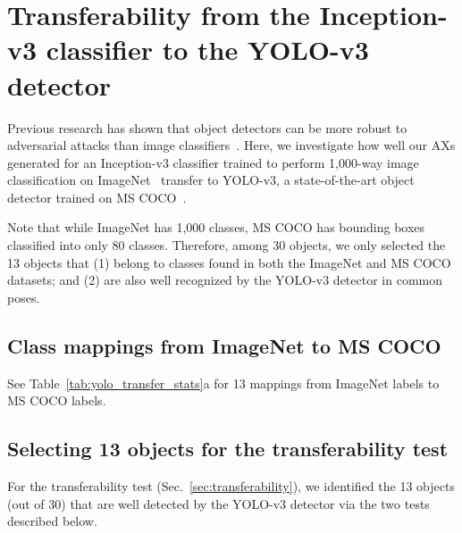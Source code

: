 \documentclass[10pt,twocolumn,letterpaper]{article}
\begin{document}
\section{Transferability from the Inception-v3 classifier to the YOLO-v3 detector}
\label{sec:yolo}

Previous research has shown that object detectors can be more robust to adversarial attacks than image classifiers~\cite{lu2017-standard}.
Here, we investigate how well our AXs generated for an Inception-v3 classifier trained to perform 1,000-way image classification on ImageNet~\cite{russakovsky2015imagenet} transfer to YOLO-v3, a state-of-the-art object detector trained on MS COCO~\cite{lin2014microsoft}.



Note that while ImageNet has 1,000 classes, MS COCO has bounding boxes classified into only 80 classes. 
Therefore, among 30 objects, we only selected the 13 objects that (1) belong to classes found in both the ImageNet and MS COCO datasets; and (2) are also well recognized by the YOLO-v3 detector in common poses.


\subsection{Class mappings from ImageNet to MS COCO}
See Table~\ref{tab:yolo_transfer_stats}a for 13 mappings from ImageNet labels to MS COCO labels.

\subsection{Selecting 13 objects for the transferability test}
For the transferability test (Sec.~\ref{sec:transferability}), we identified the 13 objects (out of 30) that are well detected by the YOLO-v3 detector via the two tests described below.
\end{document}
